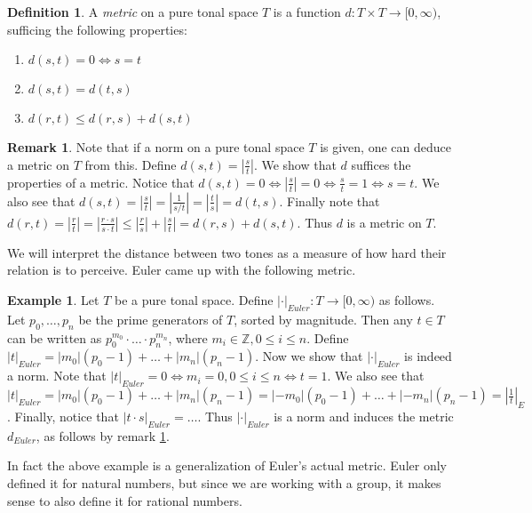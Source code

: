 \documentclass[a4paper]{article}
\theoremstyle{definition}
\newtheorem{definition}[theorem]{Definition}
\newtheorem{example}[theorem]{Example}
\newtheorem{remark}[theorem]{Remark}
\begin{document}
\begin{definition}
	A \emph{metric} on a pure tonal space $T$ is a function $d:T \times T \to [0,\infty)$, sufficing the following properties:
	\begin{enumerate}[i]
		\item $d(s,t) = 0 \Leftrightarrow s=t$
		\item $d(s,t) = d(t,s)$
		\item $d(r,t) \leq d(r,s) + d(s,t)$
	\end{enumerate}
\end{definition}

\begin{remark}
	Note that if a norm on a pure tonal space $T$ is given, one can deduce a metric on $T$ from this.
	Define $d(s,t) = |\frac{s}{t}|$.
	We show that $d$ suffices the properties of a metric.
	Notice that $d(s,t) = 0 \Leftrightarrow |\frac{s}{t}| = 0 \Leftrightarrow \frac{s}{t} = 1 \Leftrightarrow s = t$.
	We also see that $d(s,t) = |\frac{s}{t}| = |\frac{1}{s/t}| = |\frac{t}{s}| = d(t,s)$.
	Finally note that $d(r,t) = |\frac{r}{t}| = |\frac{r \cdot s}{s \cdot t}| \leq |\frac{r}{s}|+ |\frac{s}{t}| = d(r,s) + d(s,t)$.
	Thus $d$ is a metric on $T$.
	\label{norm_to_metric}
\end{remark}

We will interpret the distance between two tones as a measure of how hard their relation is to perceive.
Euler came up with the following metric.

\newcommand{\eulernorm}[1]{|#1|_{Euler}}
\newcommand{\eulermetric}{d_{Euler}}
\begin{example}
	Let $T$ be a pure tonal space.
	Define $\eulernorm{\cdot} : T \to [0,\infty )$ as follows.
	Let $p_0,\dots,p_n$ be the prime generators of $T$, sorted by magnitude.
	Then any $t \in T$ can be written as $p_0^{m_0}\cdot \dots \cdot p_n^{m_n}$, where $m_i \in \mathbb{Z}, 0 \leq i \leq n $.
	Define $\eulernorm{t} = |m_0| (p_0 - 1) + \dots + |m_n| (p_n - 1)$.
	Now we show that $\eulernorm{\cdot}$ is indeed a norm.
	Note that $\eulernorm{t} = 0 \Leftrightarrow m_i = 0, 0 \leq i \leq n \Leftrightarrow t = 1$.
	We also see that $\eulernorm{t} = |m_0| (p_0 - 1) + \dots + |m_n| (p_n - 1) = |{-m_0}| (p_0 - 1) + \dots + |{-m_n}| (p_n - 1) = |\frac{1}{t}|_E$.
	Finally, notice that $\eulernorm{t \cdot s} = \dots$.
	Thus $\eulernorm{\cdot}$ is a norm and induces the metric $\eulermetric$, as follows by remark \ref{norm_to_metric}.
\end{example}

In fact the above example is a generalization of Euler's actual metric.
Euler only defined it for natural numbers, but since we are working with a group, it makes sense to also define it for rational numbers.
\end{document}
